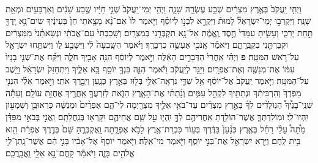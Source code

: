 \documentclass[twoside, openany, parskip=half, 11pt]{book}
\begin{document}
\begin{footnotesize}
\begin{multicols}{2}
\\
 וַיְחִ֤י יַֽעֲקֹב֙ בְּאֶ֣רֶץ מִצְרַ֔יִם שְׁבַ֥ע עֶשְׂרֵ֖ה שָׁנָ֑ה וַיְהִ֤י יְמֵי־יַֽעֲקֹב֙ שְׁנֵ֣י חַיָּ֔יו שֶׁ֣בַע שָׁנִ֔ים וְאַרְבָּעִ֥ים וּמְאַ֖ת שָׁנָֽה׃ וַיִּקְרְב֣וּ יְמֵי־יִשְׂרָאֵל֘ לָמוּת֒ וַיִּקְרָ֣א לִבְנ֣וֹ לְיוֹסֵ֗ף וַיֹּ֤אמֶר לוֹ֙ אִם־נָ֨א מָצָ֤אתִי חֵן֙ בְּעֵינֶ֔יךָ שִׂים־נָ֥א יָֽדְךָ֖ תַּ֣חַת יְרֵכִ֑י וְעָשִׂ֤יתָ עִמָּדִי֙ חֶ֣סֶד וֶֽאֱמֶ֔ת אַל־נָ֥א תִקְבְּרֵ֖נִי בְּמִצְרָֽיִם׃ וְשָֽׁכַבְתִּי֙ עִם־אֲבֹתַ֔י וּנְשָׂאתַ֨נִי֙ מִמִּצְרַ֔יִם וּקְבַרְתַּ֖נִי בִּקְבֻֽרָתָ֑ם וַיֹּאמַ֕ר אָֽנֹכִ֖י אֶעְשֶׂ֥ה כִדְבָרֶֽךָ׃ וַיֹּ֗אמֶר הִשָּֽׁבְעָה֙ לִ֔י וַיִּשָּׁבַ֖ע ל֑וֹ וַיִּשְׁתַּ֥חוּ יִשְׂרָאֵ֖ל עַל־רֹ֥אשׁ הַמִּטָּֽה׃	\textbf{פ}
 וַיְהִ֗י אַֽחֲרֵי֙ הַדְּבָרִ֣ים הָאֵ֔לֶּה וַיֹּ֣אמֶר לְיוֹסֵ֔ף הִנֵּ֥ה אָבִ֖יךָ חֹלֶ֑ה וַיִּקַּ֞ח אֶת־שְׁנֵ֤י בָנָיו֙ עִמּ֔וֹ אֶת־מְנַשֶּׁ֖ה וְאֶת־אֶפְרָֽיִם׃ וַיַּגֵּ֣ד לְיַֽעֲקֹ֔ב וַיֹּ֕אמֶר הִנֵּ֛ה בִּנְךָ֥ יוֹסֵ֖ף בָּ֣א אֵלֶ֑יךָ וַיִּתְחַזֵּק֙ יִשְׂרָאֵ֔ל וַיֵּ֖שֶׁב עַל־הַמִּטָּֽה׃ וַיֹּ֤אמֶר יַֽעֲקֹב֙ אֶל־יוֹסֵ֔ף אֵ֥ל שַׁדַּ֛י נִרְאָֽה־אֵלַ֥י בְּל֖וּז בְּאֶ֣רֶץ כְּנָ֑עַן וַיְבָ֖רֶךְ אֹתִֽי׃  וַיֹּ֣אמֶר אֵלַ֗י הִנְנִ֤י מַפְרְךָ֙ וְהִרְבִּיתִ֔ךָ וּנְתַתִּ֖יךָ לִקְהַ֣ל עַמִּ֑ים וְנָ֨תַתִּ֜י אֶת־הָאָ֧רֶץ הַזֹּ֛את לְזַרְעֲךָ֥ אַֽחֲרֶ֖יךָ אֲחֻזַּ֥ת עוֹלָֽם׃ וְעַתָּ֡ה שְׁנֵֽי־בָנֶ֩יךָ֩ הַנּֽוֹלָדִ֨ים לְךָ֜ בְּאֶ֣רֶץ מִצְרַ֗יִם עַד־בֹּאִ֥י אֵלֶ֛יךָ מִצְרַ֖יְמָה לִי־הֵ֑ם אֶפְרַ֨יִם֙ וּמְנַשֶּׁ֔ה כִּרְאוּבֵ֥ן וְשִׁמְע֖וֹן יִֽהְיוּ־לִֽי׃ וּמֽוֹלַדְתְּךָ֛ אֲשֶׁר־הוֹלַ֥דְתָּ אַֽחֲרֵיהֶ֖ם לְךָ֣ יִֽהְי֑וּ עַ֣ל שֵׁ֧ם אֲחֵיהֶ֛ם יִקָּֽרְא֖וּ בְּנַֽחֲלָתָֽם׃ וַֽאֲנִ֣י בְּבֹאִ֣י מִפַּדָּ֗ן מֵ֩תָה֩ עָלַ֨י רָחֵ֜ל בְּאֶ֤רֶץ כְּנַ֨עַן֙ בַּדֶּ֔רֶךְ בְּע֥וֹד כִּבְרַת־אֶ֖רֶץ לָבֹ֣א אֶפְרָ֑תָה וָֽאֶקְבְּרֶ֤הָ שָּׁם֙ בְּדֶ֣רֶךְ אֶפְרָ֔ת הִ֖וא בֵּ֥ית לָֽחֶם׃ וַיַּ֥רְא יִשְׂרָאֵ֖ל אֶת־בְּנֵ֣י יוֹסֵ֑ף וַיֹּ֖אמֶר מִי־אֵֽלֶּה׃ וַיֹּ֤אמֶר יוֹסֵף֙ אֶל־אָבִ֔יו בָּנַ֣י הֵ֔ם אֲשֶׁר־נָֽתַן־לִ֥י אֱלֹהִ֖ים בָּזֶ֑ה וַיֹּאמַ֕ר קָֽחֶם־נָ֥א אֵלַ֖י וַֽאֲבָֽרֲכֵֽם׃


\end{multicols}
\end{footnotesize}
\end{document}
